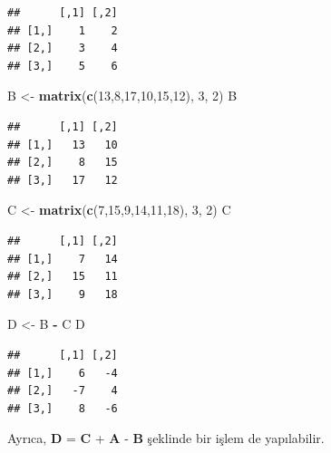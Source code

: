 \documentclass[
]{book}
\newenvironment{Shaded}{\begin{snugshade}}{\end{snugshade}}
\newcommand{\DecValTok}[1]{\textcolor[rgb]{0.00,0.00,0.81}{#1}}
\newcommand{\FunctionTok}[1]{\textcolor[rgb]{0.13,0.29,0.53}{\textbf{#1}}}
\newcommand{\NormalTok}[1]{#1}
\newcommand{\OtherTok}[1]{\textcolor[rgb]{0.56,0.35,0.01}{#1}}
\newcommand{\SpecialCharTok}[1]{\textcolor[rgb]{0.81,0.36,0.00}{\textbf{#1}}}
\begin{document}
\begin{verbatim}
##      [,1] [,2]
## [1,]    1    2
## [2,]    3    4
## [3,]    5    6
\end{verbatim}

\begin{Shaded}
\begin{Highlighting}[]
\NormalTok{ B }\OtherTok{\textless{}{-}} \FunctionTok{matrix}\NormalTok{(}\FunctionTok{c}\NormalTok{(}\DecValTok{13}\NormalTok{,}\DecValTok{8}\NormalTok{,}\DecValTok{17}\NormalTok{,}\DecValTok{10}\NormalTok{,}\DecValTok{15}\NormalTok{,}\DecValTok{12}\NormalTok{), }\DecValTok{3}\NormalTok{, }\DecValTok{2}\NormalTok{) }
\NormalTok{ B }
\end{Highlighting}
\end{Shaded}

\begin{verbatim}
##      [,1] [,2]
## [1,]   13   10
## [2,]    8   15
## [3,]   17   12
\end{verbatim}

\begin{Shaded}
\begin{Highlighting}[]
\NormalTok{ C }\OtherTok{\textless{}{-}} \FunctionTok{matrix}\NormalTok{(}\FunctionTok{c}\NormalTok{(}\DecValTok{7}\NormalTok{,}\DecValTok{15}\NormalTok{,}\DecValTok{9}\NormalTok{,}\DecValTok{14}\NormalTok{,}\DecValTok{11}\NormalTok{,}\DecValTok{18}\NormalTok{), }\DecValTok{3}\NormalTok{, }\DecValTok{2}\NormalTok{) }
\NormalTok{ C }
\end{Highlighting}
\end{Shaded}

\begin{verbatim}
##      [,1] [,2]
## [1,]    7   14
## [2,]   15   11
## [3,]    9   18
\end{verbatim}

\begin{Shaded}
\begin{Highlighting}[]
\NormalTok{ D }\OtherTok{\textless{}{-}}\NormalTok{ B }\SpecialCharTok{{-}}\NormalTok{ C }
\NormalTok{ D }
\end{Highlighting}
\end{Shaded}

\begin{verbatim}
##      [,1] [,2]
## [1,]    6   -4
## [2,]   -7    4
## [3,]    8   -6
\end{verbatim}

Ayrıca, \textbf{D} = \textbf{C} + \textbf{A} - \textbf{B} şeklinde bir işlem de yapılabilir.
\end{document}
